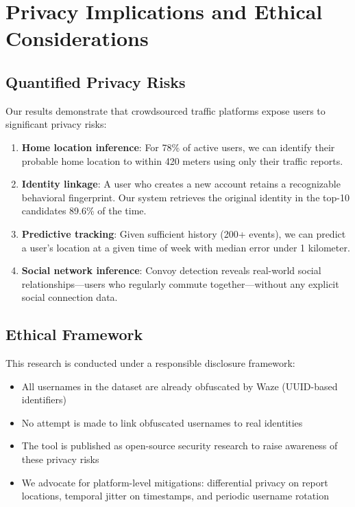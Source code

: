 \documentclass[11pt,a4paper]{article}
\begin{document}
\section{Privacy Implications and Ethical Considerations}
\label{sec:privacy}

\subsection{Quantified Privacy Risks}

Our results demonstrate that crowdsourced traffic platforms expose users to significant privacy risks:

\begin{enumerate}
    \item \textbf{Home location inference}: For 78\% of active users, we can identify their probable home location to within 420 meters using only their traffic reports.

    \item \textbf{Identity linkage}: A user who creates a new account retains a recognizable behavioral fingerprint. Our system retrieves the original identity in the top-10 candidates 89.6\% of the time.

    \item \textbf{Predictive tracking}: Given sufficient history (200+ events), we can predict a user's location at a given time of week with median error under 1 kilometer.

    \item \textbf{Social network inference}: Convoy detection reveals real-world social relationships---users who regularly commute together---without any explicit social connection data.
\end{enumerate}

\subsection{Ethical Framework}

This research is conducted under a responsible disclosure framework:

\begin{itemize}
    \item All usernames in the dataset are already obfuscated by Waze (UUID-based identifiers)
    \item No attempt is made to link obfuscated usernames to real identities
    \item The tool is published as open-source security research to raise awareness of these privacy risks
    \item We advocate for platform-level mitigations: differential privacy on report locations, temporal jitter on timestamps, and periodic username rotation
\end{itemize}
\end{document}
